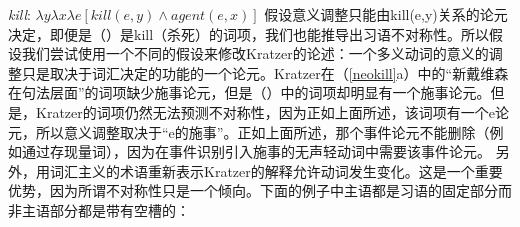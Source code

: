 \ea 
\emph{kill}: $\lambda y\lambda x\lambda e[kill(e,y) \wedge agent(e, x)]$ 
\z
假设意义调整只能由{kill(e,y)}关系的论元决定，即便是（）是kill（杀死）的词项，我们也能推导出习语不对称性。所以假设我们尝试使用一个不同的假设来修改Kratzer的论述：一个多义动词的意义的调整只是取决于词汇决定的功能的一个论元。Kratzer在（\ref{neokill}a）中的“新戴维森在句法层面”的词项缺少施事论元，但是（）中的词项却明显有一个施事论元。但是，Kratzer的词项仍然无法预测不对称性，因为正如上面所述，该词项有一个e论元，所以意义调整取决于“e的施事”。正如上面所述，那个事件论元不能删除（例如通过存现量词），因为在事件识别引入施事的无声轻动词中需要该事件论元\citep[]{Kratzer96a}。
    另外，用词汇主义的术语重新表示Kratzer的解释允许动词发生变化。这是一个重要优势，因为所谓不对称性只是一个倾向。下面的例子中主语都是习语的固定部分而非主语部分都是带有空槽的：

